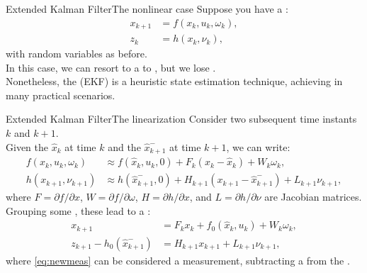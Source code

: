 \begin{frame}{Extended Kalman Filter}{The nonlinear case}
  Suppose you have a :
  \begin{subequations}
    \begin{align}
      x_{k+1} &= f(x_k,u_k,\omega_k),\\
      z_k &= h(x_k,\nu_k),
    \end{align}
  \end{subequations}
  with random variables as before.\\
  In this case, we can resort to a  to , but we lose .\\
  Nonetheless, the  (EKF) is a  heuristic state estimation technique, achieving  in many practical scenarios.
\end{frame}
\begin{frame}{Extended Kalman Filter}{The linearization}
  Consider two subsequent time instants $k$ and $k+1$.\\
  Given the  $\hat{x}_k$ at time $k$ and the  $\hat{x}_{k+1}^{-}$ at time $k+1$, we can write:
  \begin{subequations}
    \begin{align}
      f(x_k,u_k,\omega_k) &\approx f(\hat{x}_k,u_k,0) + F_k(x_k - \hat{x}_k) + W_k\omega_k,\\
      h(x_{k+1},\nu_{k+1}) &\approx h(\hat{x}_{k+1}^{-},0) + H_{k+1}(x_{k+1} - \hat{x}_{k+1}^{-}) + L_{k+1}\nu_{k+1},
    \end{align}
  \end{subequations}
  where $F=\partial f/\partial x$, $W=\partial f/\partial \omega$, $H=\partial h/\partial x$, and $L=\partial h/\partial \nu$ are Jacobian matrices.\\
  Grouping some , these lead to a :
  \begin{subequations}
    \begin{align}
      x_{k+1} &= F_k x_k + f_0(\hat{x}_k,u_k) + W_k\omega_k,\\
      z_{k+1} - h_0(\hat{x}_{k+1}^{-}) &= H_{k+1}x_{k+1} + L_{k+1}\nu_{k+1},\label{eq:newmeas}
    \end{align}
  \end{subequations}
  where \eqref{eq:newmeas} can be considered a measurement, subtracting a  from the .
\end{frame}
